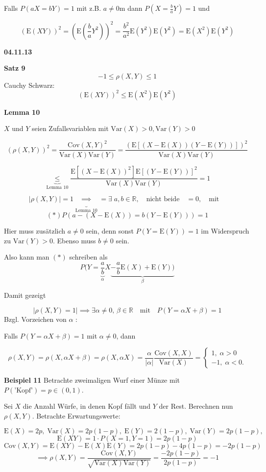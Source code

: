 \documentclass[12pt, a4paper]{article}
\newcommand{\E}{\mbox{I\negthinspace E}}
\theoremstyle{empty}
\newcommand{\R}{\mathbb{R}}
\newcommand{\1}{\mathds{1}}
\renewcommand{\E}{\mathrm{E}}
\newcommand{\Var}{\mathrm{Var}}
\newcommand{\Cov}{\mathrm{Cov}}
\providecommand{\abs}[1]{\lvert#1\rvert}
\providecommand{\mtext}[1]{\quad \text{#1} \quad}
\begin{document}
Falls $P(aX = bY) = 1$ mit z.B. $a \neq 0$m dann $P(X=\frac{b}{a}Y)=1$ und 

\[  (\E(XY))^2 = (\E(\frac{b}{a}Y^2))^2   = \frac{b^2}{a^2} \E(Y^2) \E(Y^2) = \E(X^2)\E(Y^2)   \]


\textbf{04.11.13}

\textbf{Satz 9} \[-1 \leq \rho(X,Y) \leq 1\]
Cauchy Schwarz: \[(\E(XY))^2 \leq \E(X^2)\E(Y^2) \]

\textbf{Lemma 10}

$X$ und $Y$ seien Zufallsvariablen mit $\Var(X) > 0, \Var (Y) > 0$

\[ (\rho(X,Y))^2 = \frac{\Cov(X,Y)^2}{\Var(X)\Var(Y)} = \frac{(\E[(X-\E(X)) (Y-\E(Y))])^2}{\Var(X)\Var(Y)}    \]

\[    \underbrace{\leq}_{\text{Lemma 10}} \frac{\E[(  X-\E(X) )^2]  \E[(Y-\E(Y))]^2  }{\Var(X)\Var(Y)} = 1         \]

\[ \abs{\rho(X,Y)} = 1 \underbrace{\implies}_{\text{Lemma 10}} = \exists \; a,b \in \R, \mtext{nicht beide} = 0, \mtext{mit}\]
\[ (*) P(a-(X-\E(X)) = b(Y-\E(Y)) ) = 1        \]

Hier muss zusätzlich $a \neq 0$ sein, denn sonst $P(Y=\E(Y)) = 1$ im Widerspruch zu $\Var(Y) > 0$. Ebenso muss $b \neq 0$ sein.

Also kann man $(*)$ schreiben als \[  P(Y = \underbrace{\frac{a}{b}}_{\alpha} X  \underbrace{- \frac{a}{b} \E(X) + \E(Y))}_{\beta}    \]

Damit gezeigt

\[   \abs{\rho(X,Y) = 1} \implies \exists \alpha \neq 0, \, \beta \in \R \mtext{mit} P(Y = \alpha X + \beta) = 1    \]
Bzgl. Vorzeichen von $\alpha$ : 

Falls $P(Y = \alpha X + \beta) = 1$ mit $\alpha \neq 0$, dann

\[   \rho(X,Y) = \rho(X, \alpha X + \beta) = \rho(X, \alpha X) =  \frac{\alpha}{\abs{\alpha}} \frac{\Cov(X,X)}{\Var(X)} = \begin{cases} 1, \; \alpha > 0 \\ -1, \; \alpha < 0. \end{cases}   \]

\textbf{Beispiel 11} Betrachte zweimaligen Wurf einer Münze mit $P(\text{'Kopf'}) = p \in (0,1)$.

Sei $X$ die Anzahl Würfe, in denen Kopf fällt und $Y$ der Rest. Berechnen nun $\rho(X,Y)$. Betrachte Erwartungswerte:

\[  \E(X) = 2p, \; \Var(X) = 2p(1-p), \; \E(Y) = 2(1-p), \; \Var(Y) = 2p(1-p), \]
\[ \E(XY) = 1 \cdot P(X=1, Y=1) = 2p(1-p)     \]
\[  \Cov(X,Y) = \E(XY) - \E(X)\E(Y) = 2p(1-p) - 4p(1-p) = -2p(1-p) \]
\[ \implies \rho(X,Y) = \frac{\Cov(X,Y)}{\sqrt{\Var(X)\Var(Y)}} = \frac{-2p(1-p)}{2p(1-p)} = -1  \]
\end{document}
